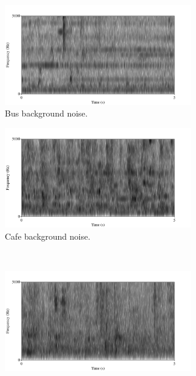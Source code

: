 \documentclass[dissertation,copyright]{uathesis}
\begin{document}
\begin{figure}[h!]
\begin{subfigure}{0.475\linewidth}
  \centering
  \includegraphics[width=0.9\textwidth]{figure/spctgrm-bus-background.png}
  \caption{Bus background noise.}
  \label{fig:bus-bkgrnd}
\end{subfigure}
\qquad
\begin{subfigure}{0.475\linewidth}
  \centering
  \includegraphics[width=0.9\textwidth]{figure/spctgrm-cafe-background.png}
  \caption{Cafe background noise.}
  \label{fig:cafe-bkgrnd}
\end{subfigure}%
\\[2ex]
\begin{subfigure}{0.475\linewidth}
  \centering
  \includegraphics[width=0.9\textwidth]{figure/spctgrm-ped-background.png}

\end{subfigure}
\end{figure}
\end{document}
